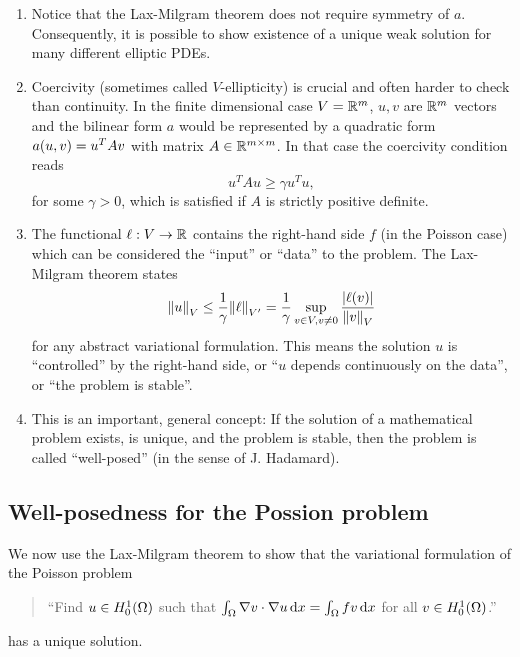 \begin{remark}
	\begin{enumerate}
		\item Notice that the Lax-Milgram theorem does not require symmetry of \(a\).
		Consequently, it is possible to show existence of a unique weak solution for many different elliptic PDEs.
		\item Coercivity (sometimes called \(V\)-ellipticity) is crucial and often harder to check than continuity.
		In the finite dimensional case \(V = \mathbb{R}^m\), \(u, v\) are \(\mathbb{R}^m\) vectors and the bilinear form \(a\) would be represented by a quadratic form \(a\parentheses*{u, v} = u^T Av\) with matrix \(A \in \mathbb{R}^{m \times m}\).
		In that case the coercivity condition reads
		\[
			u^T Au \ge \gamma u^T u,
		\]
		for some \(\gamma > 0\), which is satisfied if \(A\) is strictly positive definite.
		\item The functional \(\ell: V \to \mathbb{R}\) contains the right-hand side \(f\) (in the Poisson case) which can be considered the ``input'' or ``data'' to the problem.
		The Lax-Milgram theorem states
		\[
			\norm*{u}_V \le \frac{1}{\gamma}\norm*{\ell}_{V'} = \frac{1}{\gamma}\sup_{v \in V, v \ne 0}\frac{\absolute*{\ell\parentheses*{v}}}{\norm*{v}_V}
		\]
		for any abstract variational formulation.
		This means the solution \(u\) is ``controlled'' by the right-hand side, or ``\(u\) depends continuously on the data'', or ``the problem is stable''.
		\item This is an important, general concept:
		If the solution of a mathematical problem exists, is unique, and the problem is stable, then the problem is called ``well-posed'' (in the sense of J. Hadamard).
	\end{enumerate}
\end{remark}


\subsection{Well-posedness for the Possion problem}

We now use the Lax-Milgram theorem to show that the variational formulation of the Poisson problem
\begin{quote}
	``Find \(u \in H_0^1\parentheses*{\Omega}\) such that \(\int_\Omega \nabla v \cdot \nabla u\mathop{\mathrm{d}\!} x = \int_\Omega fv\mathop{\mathrm{d}\!} x\) for all \(v \in H_0^1\parentheses*{\Omega}\).''
\end{quote}
has a unique solution.

